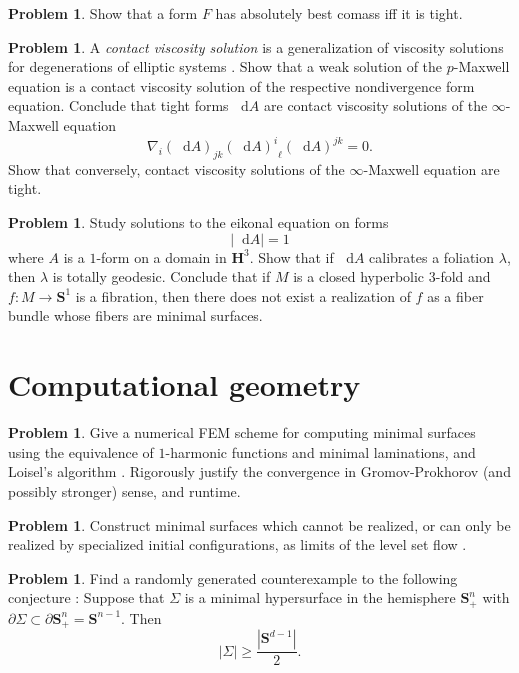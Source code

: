 \documentclass[reqno,11pt]{amsart}
\newcommand{\Hyp}{\mathbf H}
\newcommand{\Sph}{\mathbf S}
\newcommand*\dif{\mathop{}\!\mathrm{d}}
\newcommand{\dfn}[1]{\emph{#1}\index{#1}}
\theoremstyle{definition}
\newtheorem{problem}[theorem]{Problem}
\numberwithin{equation}{section}
\begin{document}
\begin{problem}
Show that a form $F$ has absolutely best comass iff it is tight.
\end{problem}

\begin{problem}
A \dfn{contact viscosity solution} is a generalization of viscosity solutions for degenerations of elliptic systems \cite{katzourakis2022vectorvalued}.
Show that a weak solution of the $p$-Maxwell equation is a contact viscosity solution of the respective nondivergence form equation.
Conclude that tight forms $\dif A$ are contact viscosity solutions of the $\infty$-Maxwell equation 
$$\nabla_i (\dif A)_{jk} {(\dif A)^i}_\ell (\dif A)^{jk} = 0.$$
Show that conversely, contact viscosity solutions of the $\infty$-Maxwell equation are tight.
\end{problem}

\begin{problem}
Study solutions to the eikonal equation on forms 
$$|\dif A| = 1$$
where $A$ is a $1$-form on a domain in $\Hyp^3$.
Show that if $\dif A$ calibrates a foliation $\lambda$, then $\lambda$ is totally geodesic.
Conclude that if $M$ is a closed hyperbolic $3$-fold and $f: M \to \Sph^1$ is a fibration, then there does not exist a realization of $f$ as a fiber bundle whose fibers are minimal surfaces.
\end{problem}

\section{Computational geometry}
\begin{problem}
Give a numerical FEM scheme for computing minimal surfaces using the equivalence of $1$-harmonic functions and minimal laminations, and Loisel's algorithm \cite{Loisel20}.
Rigorously justify the convergence in Gromov-Prokhorov (and possibly stronger) sense, and runtime.
\end{problem}

\begin{problem}
Construct minimal surfaces which cannot be realized, or can only be realized by specialized initial configurations, as limits of the level set flow \cite{CHOPP199377}.
\end{problem}

\begin{problem}
Find a randomly generated counterexample to the following conjecture \cite[Conjecture 5.3]{naff2022prescribed}:
Suppose that $\Sigma$ is a minimal hypersurface in the hemisphere $\Sph^n_+$ with $\partial \Sigma \subset \partial \Sph^n_+ = \Sph^{n - 1}$.
Then
$$|\Sigma| \geq \frac{|\Sph^{d - 1}|}{2}.$$
\end{problem}
\end{document}
